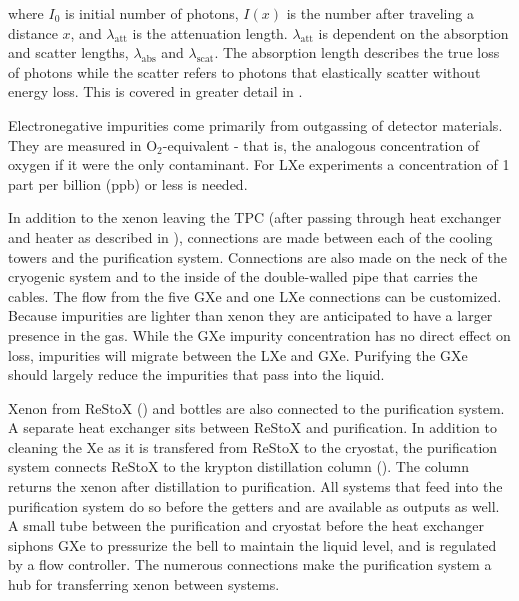 \noindent where $I_0$ is initial number of photons, $I(x)$ is the number after traveling a distance $x$, and $\lambda_{\mathrm{att}}$ is
the
attenuation length.  $\lambda_{\mathrm{att}}$ is dependent on the absorption and scatter lengths, $\lambda_{\mathrm{abs}}$ and
$\lambda_{\mathrm{scat}}$.  The absorption length describes the true loss of photons while the scatter refers to photons that elastically
scatter without energy loss.  This is covered in greater detail in .

Electronegative impurities come primarily from outgassing of detector materials.  They are measured in O$_2$-equivalent - that is, the
analogous concentration of oxygen if it
were the only contaminant.  For LXe experiments a concentration of 1 part per billion (ppb) or less is needed.

In addition to the xenon leaving the TPC (after passing through heat exchanger and heater as described in ),
connections are made between
each of the cooling towers and the purification system.  Connections are also made on the neck of the cryogenic system and to the
inside of the double-walled pipe that carries the cables.  The flow from the five GXe and one LXe connections can be customized.  Because
impurities are lighter than xenon they are anticipated to have a larger
presence in the gas.  While the GXe impurity concentration has no direct effect on \electron loss, impurities will migrate between the
LXe and GXe.  Purifying the GXe should largely reduce the impurities that pass into the liquid.

Xenon from ReStoX  () and bottles are also connected to the purification system.  A separate heat exchanger
sits between ReStoX and purification.  In
addition to cleaning the Xe as it is transfered from ReStoX to the cryostat, the purification system connects ReStoX to the krypton
distillation column ().  The column returns the xenon after distillation to purification.  All systems that
feed into the purification system do so before the getters and are available as outputs as well.  A small tube between the purification
and cryostat before the heat exchanger siphons GXe to pressurize the bell to maintain the liquid level, and is regulated by a flow
controller.  The numerous connections make the purification system a hub for transferring xenon between systems.

